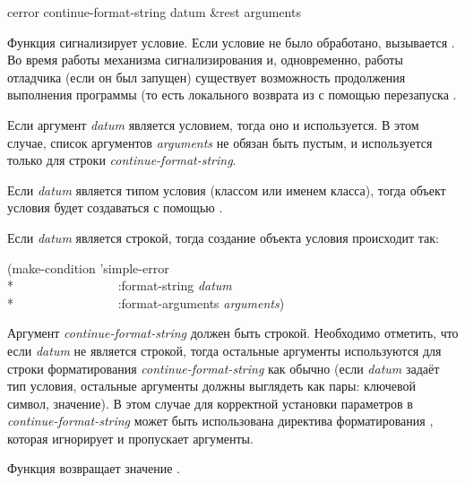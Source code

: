 \begin{defun}[Функция]
cerror continue-format-string datum &rest arguments

Функция  сигнализирует условие. Если условие не было обработано,
вызывается . Во время работы механизма
сигнализирования и, одновременно, работы отладчика (если он был запущен)
существует возможность продолжения выполнения программы (то есть локального
возврата из  с помощью перезапуска .

Если аргумент \emph{datum} является условием, тогда оно и используется. 
В этом случае, список аргументов \emph{arguments} не обязан быть пустым, и
используется только для строки \emph{continue-format-string}.

Если \emph{datum} является типом условия (классом или именем класса), тогда
объект условия будет создаваться с помощью .

Если \emph{datum} является строкой, тогда создание объекта условия происходит так:
\begin{lisp}
(make-condition 'simple-error \\*
~~~~~~~~~~~~~~~~:format-string \emph{datum} \\*
~~~~~~~~~~~~~~~~:format-arguments \emph{arguments})
\end{lisp}

Аргумент \emph{continue-format-string} должен быть строкой. Необходимо отметить,
что если \emph{datum} не является строкой, тогда остальные аргументы
используются для строки форматирования \emph{continue-format-string} как обычно
(если \emph{datum} задаёт тип условия, остальные аргументы должны выглядеть как
пары: ключевой символ, значение). В этом случае для корректной установки
параметров в \emph{continue-format-string} может быть использована директива
форматирования \cd{{\Xtilde}*}, которая игнорирует и пропускает аргументы.

Функция  возвращает значение .
\end{defun}

